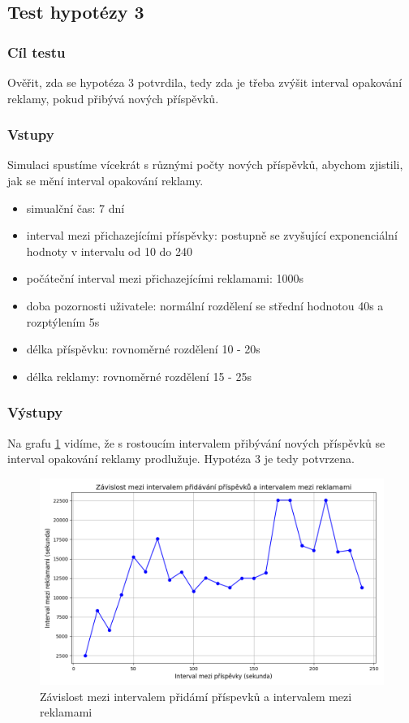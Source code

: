 \documentclass[11pt, a4paper]{article}
\begin{document}
\subsection{Test hypotézy 3}
\subsubsection{Cíl testu}
Ověřit, zda se hypotéza 3 potvrdila, tedy zda je třeba zvýšit interval opakování reklamy, pokud přibývá nových příspěvků.
\subsubsection{Vstupy}
Simulaci spustíme vícekrát s různými počty nových příspěvků, abychom zjistili, jak se mění interval opakování reklamy.
\begin{itemize}
    \item simualční čas: 7 dní
    \item interval mezi přichazejícími příspěvky: postupně se zvyšující exponenciální hodnoty v intervalu od 10 do 240
    \item počáteční interval mezi přichazejícími reklamami: 1000s
    \item doba pozornosti uživatele: normální rozdělení se střední hodnotou 40s a rozptýlením 5s
    \item délka příspěvku: rovnoměrné rozdělení 10 - 20s
    \item délka reklamy: rovnoměrné rozdělení 15 - 25s

\end{itemize}
\subsubsection{Výstupy}
Na grafu \ref{fig:post_arrival_time_vs_ad_interval} vidíme, že s rostoucím intervalem přibývání nových příspěvků se interval opakování reklamy prodlužuje. 
Hypotéza 3 je tedy potvrzena.
\begin{figure}[h]
    \centering
    \includegraphics[width=\linewidth]{post_arrival_time_vs_ad_interval.png}
    \caption{Závislost mezi intervalem přidámí příspevků a intervalem mezi reklamami}
    \label{fig:post_arrival_time_vs_ad_interval}
\end{figure}
\newpage
\end{document}
